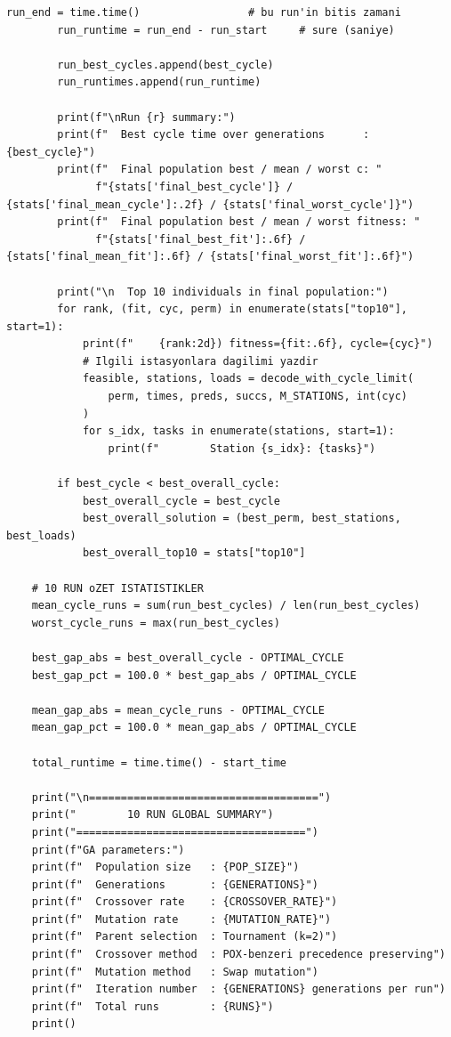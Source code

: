 \documentclass[12pt,a4paper]{article}
\begin{document}
\begin{lstlisting}[style=atomone,
caption={Python implementation of the genetic algorithm for the U-shaped assembly line balancing problem (UALBP-II) on the ARC83 instance.},
label={lst:ga-arc83-full}]
        run_end = time.time()                 # bu run'in bitis zamani
        run_runtime = run_end - run_start     # sure (saniye)

        run_best_cycles.append(best_cycle)
        run_runtimes.append(run_runtime)

        print(f"\nRun {r} summary:")
        print(f"  Best cycle time over generations      : {best_cycle}")
        print(f"  Final population best / mean / worst c: "
              f"{stats['final_best_cycle']} / {stats['final_mean_cycle']:.2f} / {stats['final_worst_cycle']}")
        print(f"  Final population best / mean / worst fitness: "
              f"{stats['final_best_fit']:.6f} / {stats['final_mean_fit']:.6f} / {stats['final_worst_fit']:.6f}")

        print("\n  Top 10 individuals in final population:")
        for rank, (fit, cyc, perm) in enumerate(stats["top10"], start=1):
            print(f"    {rank:2d}) fitness={fit:.6f}, cycle={cyc}")
            # Ilgili istasyonlara dagilimi yazdir
            feasible, stations, loads = decode_with_cycle_limit(
                perm, times, preds, succs, M_STATIONS, int(cyc)
            )
            for s_idx, tasks in enumerate(stations, start=1):
                print(f"        Station {s_idx}: {tasks}")

        if best_cycle < best_overall_cycle:
            best_overall_cycle = best_cycle
            best_overall_solution = (best_perm, best_stations, best_loads)
            best_overall_top10 = stats["top10"]

    # 10 RUN oZET ISTATISTIKLER
    mean_cycle_runs = sum(run_best_cycles) / len(run_best_cycles)
    worst_cycle_runs = max(run_best_cycles)

    best_gap_abs = best_overall_cycle - OPTIMAL_CYCLE
    best_gap_pct = 100.0 * best_gap_abs / OPTIMAL_CYCLE

    mean_gap_abs = mean_cycle_runs - OPTIMAL_CYCLE
    mean_gap_pct = 100.0 * mean_gap_abs / OPTIMAL_CYCLE

    total_runtime = time.time() - start_time

    print("\n====================================")
    print("        10 RUN GLOBAL SUMMARY")
    print("====================================")
    print(f"GA parameters:")
    print(f"  Population size   : {POP_SIZE}")
    print(f"  Generations       : {GENERATIONS}")
    print(f"  Crossover rate    : {CROSSOVER_RATE}")
    print(f"  Mutation rate     : {MUTATION_RATE}")
    print(f"  Parent selection  : Tournament (k=2)")
    print(f"  Crossover method  : POX-benzeri precedence preserving")
    print(f"  Mutation method   : Swap mutation")
    print(f"  Iteration number  : {GENERATIONS} generations per run")
    print(f"  Total runs        : {RUNS}")
    print()


\end{lstlisting}
\end{document}
